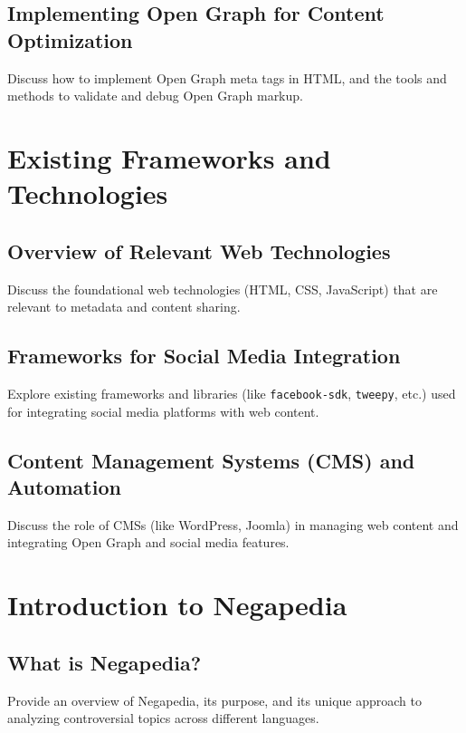 \subsection{Implementing Open Graph for Content Optimization}
\label{subsec:implementing_open_graph_for_content_optimization}
Discuss how to implement Open Graph meta tags in HTML, and the tools and methods to validate and debug Open Graph markup.

\section{Existing Frameworks and Technologies}
\label{sec:frameworks_technologies}

\subsection{Overview of Relevant Web Technologies}
\label{subsec:overview_of_relevant_web_technologies}
Discuss the foundational web technologies (HTML, CSS, JavaScript) that are relevant to metadata and content sharing.

\subsection{Frameworks for Social Media Integration}
\label{subsec:frameworks_for_social_media_integration}
Explore existing frameworks and libraries (like \texttt{facebook-sdk}, \texttt{tweepy}, etc.) used for integrating social media platforms with web content.

\subsection{Content Management Systems (CMS) and Automation}
\label{subsec:content_management_systems_cms_and_automation}
Discuss the role of CMSs (like WordPress, Joomla) in managing web content and integrating Open Graph and social media features.

\section{Introduction to Negapedia}
\label{sec:introduction_to_negapedia}

\subsection{What is Negapedia?}
\label{subsec:what_is_negapedia}
Provide an overview of Negapedia, its purpose, and its unique approach to analyzing controversial topics across different languages.

